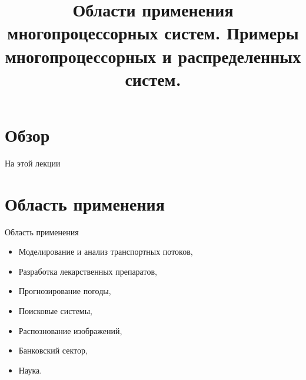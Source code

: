 

\title{Области применения многопроцессорных систем. Примеры многопроцессорных и распределенных систем.}



\begin{frame}
\titlepage
\end{frame}

\section*{Обзор}

\begin{frame}{На этой лекции}
\tableofcontents
\end{frame}

\section{Область применения}

\begin{frame}{Область применения}
\begin{itemize}
    \item Моделирование и анализ транспортных потоков,
    \item Разработка лекарственных препаратов,
    \item Прогнозирование погоды,
    \item Поисковые системы,
    \item Распознование изображений,
    \item Банковский сектор,
    \item Наука.
\end{itemize}
\end{frame}

